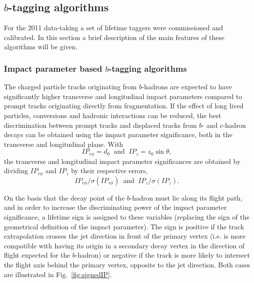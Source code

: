 \subsection{$b$-tagging algorithms}

For the 2011 data-taking a set of lifetime taggers were commissioned and calibrated. In this section a brief description of the main features of these algorithms will be given. 

\subsubsection{Impact parameter based $b$-tagging algorithms }


The charged particle tracks originating from $b$-hadrons are expected to have significantly higher transverse and longitudinal impact parameters compared to prompt tracks originating directly from fragmentation. If the effect of long lived particles, conversions and hadronic interactions can be reduced, the best discrimination between prompt tracks and displaced tracks from $b$- and $c$-hadron decays can be obtained using the impact parameter significance, both in the transverse and longitudinal plane. With
%
\begin{equation}
    IP_{r\phi} = d_0\;\;  \mbox{and} \;\;  IP_{z} = z_0 \sin \theta,
\end{equation}
%
the transverse and longitudinal impact parameter significances are obtained by dividing $IP_{r\phi}$ and $IP_z$ by their respective errors,
\begin{equation}
    IP_{r\phi}/\sigma(IP_{r\phi})\;\; \mbox{and} \;\;  IP_{z}/\sigma(IP_{z}).
\end{equation}
%

On the basis that the decay point of the $b$-hadron must lie along its flight path, and in order to increase the discriminating power of the impact parameter significance, a lifetime sign is assigned to these variables (replacing the sign of the geometrical definition of the impact parameter). The sign is positive if the track extrapolation crosses the jet direction in front of the primary vertex (i.e. is more compatible with having its origin in a secondary decay vertex in the direction of flight expected for the $b$-hadron) or negative if the track is more likely to intersect the flight axis behind the primary vertex, opposite to the jet direction. Both cases are illustrated in Fig.~\ref{fig:signedIP}. 

